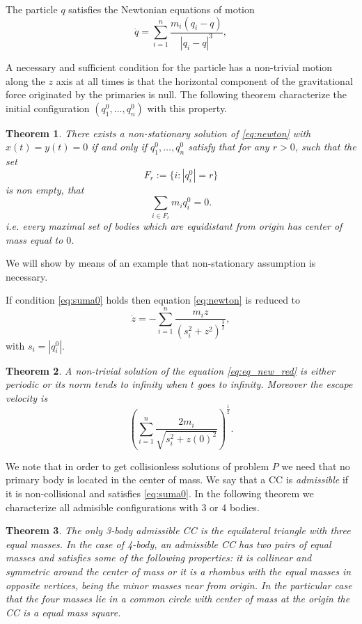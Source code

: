 \documentclass[twoside]{article}
\newtheorem{thm}{Theorem}[section]
\theoremstyle{remark}
\newcounter{example}
\begin{document}
The particle $q$ satisfies the Newtonian equations of motion
\begin{equation}\label{eq:newton}
 \ddot{q}=\sum_{i=1}^n\frac{m_i(q_i-q)}{|q_i-q|^3},
\end{equation}

A necessary and sufficient condition for the particle  has a non-trivial motion along the $z$ axis at all times is that the horizontal component of the gravitational force originated by the primaries is null. The following theorem characterize the initial configuration $(q_1^0,\ldots,q_n^0)$ with this property.


\begin{thm}\label{thm:prim} There exists a non-stationary  solution of \eqref{eq:newton} with $x(t)=y(t)=0$ if and only if $q^0_1,\ldots,q^ 0_n$ satisfy that for any $r>0$, such that the set
\[F_r:=\{i:|q_i^ 0|=r\}\]
is non empty, that
\begin{equation}\label{eq:suma0}\sum_{i\in F_r}m_iq_i^ 0=0.\end{equation}
i.e. every maximal set of  bodies which are equidistant from origin has center of mass equal to $0$.
\end{thm}
We will show by means of an example that non-stationary assumption is necessary.

If condition \eqref{eq:suma0} holds then equation \eqref{eq:newton} is reduced to
\begin{equation}\label{eq:eq_new_red}
 \ddot{z}=-\sum_{i=1 }^n\frac{m_iz}{(s_i^2+z^2)^{\frac32}},
\end{equation}
with  $s_i=|q_i^0|$.






\begin{thm}\label{thm:sol.perio.o.infinito}
A non-trivial solution of the equation \eqref{eq:eq_new_red} is either periodic or  its norm tends to infinity when $t$ goes to infinity. Moreover the escape velocity is \[\left(\sum_{i=1}^{n}\frac{2m_i}{\sqrt{s_i^2+z(0)^2}}\right)^{\frac12}.\]
\end{thm}


We note that in order to get collisionless solutions of problem $P$ we need that no primary body is located in the center of mass. We say that a
CC is \emph{admissible} if it is non-collisional and satisfies \eqref{eq:suma0}. In the following theorem we characterize all admisible configurations with 3 or 4 bodies.

\begin{thm}\label{thm:caracterizacion}
The only 3-body admissible CC is the equilateral triangle with three equal masses. In the case of 4-body, an admissible CC  has two pairs of equal masses and satisfies some of the following properties: it is collinear and symmetric around the center of mass or it is a rhombus with the equal masses in opposite vertices, being the minor masses near from origin. In the particular case that the four masses  lie in a common circle with center of mass at the origin the CC is a  equal mass square.
\end{thm}
\end{document}
